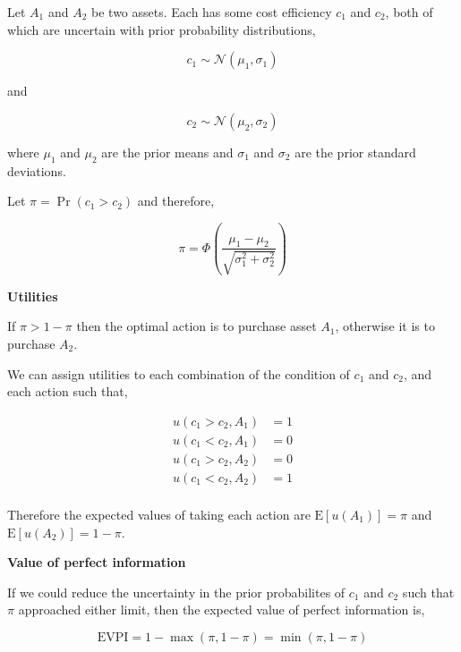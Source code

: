 \documentclass[]{article}
\theoremstyle{definition}
\theoremstyle{definition}
\theoremstyle{remark}
\begin{document}
Let \(A_1\) and \(A_2\) be two assets. Each has some cost efficiency
\(c_1\) and \(c_2\), both of which are uncertain with prior probability
distributions,

\begin{equation}
c_1\sim\mathcal{N}(\mu_1, \sigma_1)
\label{eq:c1}
\end{equation}

and

\begin{equation}
c_2\sim\mathcal{N}(\mu_2, \sigma_2)
\label{eq:c2}
\end{equation}

where \(\mu_1\) and \(\mu_2\) are the prior means and \(\sigma_1\) and
\(\sigma_2\) are the prior standard deviations.

Let \(\pi=\Pr(c_1 > c_2)\) and therefore,

\begin{equation}
\pi = \Phi\left(\frac{\mu_1-\mu_2}{\sqrt{\sigma^2_1+\sigma^2_2}}\right)
\label{eq:c2}
\end{equation}

\textbf{Utilities}

If \(\pi > 1 - \pi\) then the optimal action is to purchase asset
\(A_1\), otherwise it is to purchase \(A_2\).

We can assign utilities to each combination of the condition of \(c_1\)
and \(c_2\), and each action such that,

\begin{equation}
\begin{aligned}
u(c_1 > c_2, A_1)&=1\\
u(c_1 < c_2, A_1)&=0\\
u(c_1 > c_2, A_2)&=0\\
u(c_1 < c_2, A_2)&=1\\
\end{aligned}
\label{eq:utilitiesapen}
\end{equation}

Therefore the expected values of taking each action are
\(\mathrm{E}[u(A_1)]=\pi\) and \(\mathrm{E}[u(A_2)]=1-\pi\).

\textbf{Value of perfect information}

If we could reduce the uncertainty in the prior probabilites of \(c_1\)
and \(c_2\) such that \(\pi\) approached either limit, then the expected
value of perfect information is,

\begin{equation}
\mathrm{EVPI}=1-\max(\pi, 1-\pi)=\min(\pi, 1-\pi)
\label{eq:evpiaucapen}
\end{equation}
\end{document}
